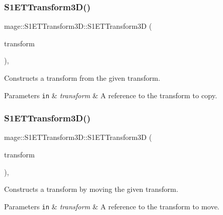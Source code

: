 \subsubsection{\texorpdfstring{S1\+E\+T\+Transform3\+D()}{S1ETTransform3D()}\hspace{0.1cm}{\footnotesize\ttfamily [3/4]}}
{\footnotesize\ttfamily mage\+::\+S1\+E\+T\+Transform3\+D\+::\+S1\+E\+T\+Transform3D (\begin{DoxyParamCaption}\item[{const \mbox{\hyperlink{classmage_1_1_s1_e_t_transform3_d}{S1\+E\+T\+Transform3D}} \&}]{transform }\end{DoxyParamCaption})\hspace{0.3cm}{\ttfamily [default]}, {\ttfamily [noexcept]}}

Constructs a transform from the given transform.


\begin{DoxyParams}[1]{Parameters}
\mbox{\tt in}  & {\em transform} & A reference to the transform to copy. \\
\hline
\end{DoxyParams}
\mbox{\label{classmage_1_1_s1_e_t_transform3_d_a0e35654ae6a2f2dfc3857d73eafc3f45}} 
\subsubsection{\texorpdfstring{S1\+E\+T\+Transform3\+D()}{S1ETTransform3D()}\hspace{0.1cm}{\footnotesize\ttfamily [4/4]}}
{\footnotesize\ttfamily mage\+::\+S1\+E\+T\+Transform3\+D\+::\+S1\+E\+T\+Transform3D (\begin{DoxyParamCaption}\item[{\mbox{\hyperlink{classmage_1_1_s1_e_t_transform3_d}{S1\+E\+T\+Transform3D}} \&\&}]{transform }\end{DoxyParamCaption})\hspace{0.3cm}{\ttfamily [default]}, {\ttfamily [noexcept]}}

Constructs a transform by moving the given transform.


\begin{DoxyParams}[1]{Parameters}
\mbox{\tt in}  & {\em transform} & A reference to the transform to move. \\
\hline
\end{DoxyParams}
\mbox{\label{classmage_1_1_s1_e_t_transform3_d_af689e067dee401ee30dadaaed027835e}} 

